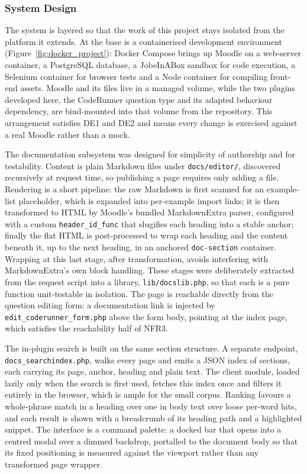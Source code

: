 \subsubsection{System Design}

The system is layered so that the work of this project stays isolated from the platform it extends. At the base is a containerised development environment (Figure~\ref{fig:docker_project}): Docker Compose brings up Moodle on a web-server container, a PostgreSQL database, a JobeInABox sandbox for code execution, a Selenium container for browser tests and a Node container for compiling front-end assets. Moodle and its files live in a managed volume, while the two plugins developed here, the CodeRunner question type and its adapted behaviour dependency, are bind-mounted into that volume from the repository. This arrangement satisfies DE1 and DE2 and means every change is exercised against a real Moodle rather than a mock.

The documentation subsystem was designed for simplicity of authorship and for testability. Content is plain Markdown files under \texttt{docs/editor/}, discovered recursively at request time, so publishing a page requires only adding a file. Rendering is a short pipeline: the raw Markdown is first scanned for an example-list placeholder, which is expanded into per-example import links; it is then transformed to HTML by Moodle's bundled MarkdownExtra parser, configured with a custom \texttt{header\_id\_func} that slugifies each heading into a stable anchor; finally the flat HTML is post-processed to wrap each heading and the content beneath it, up to the next heading, in an anchored \texttt{doc-section} container. Wrapping at this last stage, after transformation, avoids interfering with MarkdownExtra's own block handling. These stages were deliberately extracted from the request script into a library, \texttt{lib/docslib.php}, so that each is a pure function unit-testable in isolation. The page is reachable directly from the question editing form: a documentation link is injected by \texttt{edit\_coderunner\_form.php} above the form body, pointing at the index page, which satisfies the reachability half of NFR3.

The in-plugin search is built on the same section structure. A separate endpoint, \texttt{docs\_searchindex.php}, walks every page and emits a JSON index of sections, each carrying its page, anchor, heading and plain text. The client module, loaded lazily only when the search is first used, fetches this index once and filters it entirely in the browser, which is ample for the small corpus. Ranking favours a whole-phrase match in a heading over one in body text over loose per-word hits, and each result is shown with a breadcrumb of its heading path and a highlighted snippet. The interface is a command palette: a docked bar that opens into a centred modal over a dimmed backdrop, portalled to the document body so that its fixed positioning is measured against the viewport rather than any transformed page wrapper.

